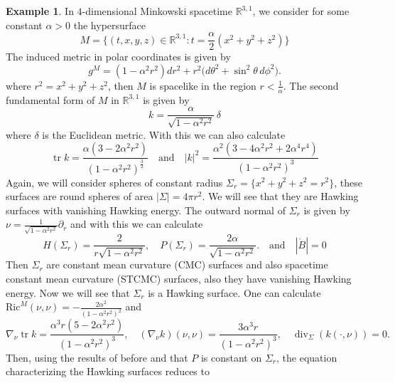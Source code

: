\documentclass[12pt,a4paper]{amsart}
\theoremstyle{plain}
\theoremstyle{definition}
\newtheorem{example}[theorem]{Example}
\newcommand{\diver}{\operatorname{div}}
\newcommand{\tr}{\operatorname{tr}}
\begin{document}
\begin{example}\label{example2}
      In $4$-dimensional Minkowski spacetime  \( \mathbb{R}^{3,1} \), we consider for some constant $\alpha>0$ the hypersurface
$$M=\{(t,x,y,z) \in \mathbb{R}^{3,1} : t=\frac{\alpha}{2} (x^2+y^2+z^2)\} $$
The induced metric in polar coordinates is given by 
\begin{equation}
    g^M = (1-\alpha^2r^2)dr^2
+
r^2 \bigl(d\theta^2 + \sin^2\!\theta\,d\phi^2\bigr).
\end{equation}
where $r^2=x^2+y^2+z^2$, then $M$ is spacelike in the region $r<\frac{1}{\alpha}$.  The second fundamental form of $M$ in $\mathbb{R}^{3,1} $ is given by 
\begin{equation}
    k=\frac{\alpha}{\sqrt{1-\alpha^2r^2 }} \,\delta  
\end{equation}
where $\delta$ is the Euclidean metric. With this we can also calculate
\begin{equation}
    \tr k= \frac{\alpha (3-2\alpha^2r^2)}{(1-\alpha^2 r^2 )^\frac{3}{2}}\quad \text{and} \quad |k|^2= \frac{\alpha^2 (3-4\alpha^2 r^2 +2\alpha^4 r^4)}{(1-\alpha^2 r^2)^3}
\end{equation}
     Again, we will consider spheres of constant radius $\Sigma_r= \{x^2+y^2+z^2=r^2 \}$, these surfaces are round spheres of area $|\Sigma|=4\pi r^2$. We will see that they are Hawking surfaces with vanishing Hawking energy. The outward normal of $\Sigma_r$ is given by $\nu = \frac{1}{\sqrt{1-\alpha^2r^2 }} \partial_r$ and with this we can calculate 
\begin{equation}
    H(\Sigma_r)= \frac{2}{r\sqrt{1-\alpha^2r^2 }},  \quad P(\Sigma_r)= \frac{2\alpha }{\sqrt{1-\alpha^2r^2 }}. \quad \text{and} \quad  |\mathring{B}|=0
\end{equation}
Then $\Sigma_r$ are constant mean curvature (CMC) surfaces and also spacetime constant mean curvature (STCMC) surfaces, also they have vanishing Hawking energy.  Now we will see that $\Sigma_r$ is a Hawking surface. One can calculate $\mathrm{Ric}^M(\nu, \nu)=-\frac{2\alpha^2 }{(1-\alpha^2 r^2 )^2} $ and 
\begin{equation}
    \nabla_\nu \tr k = \frac{\alpha^3r(5-2\alpha^2 r^2)}{(1-\alpha^2r^2)^3}, \quad (\nabla_\nu k)(\nu,\nu)= \frac{3\alpha^3r}{(1-\alpha^2r^2)^3}, \quad \diver_\Sigma (k(\cdot, \nu))=0 .
\end{equation}
Then, using the results of before and that $P$ is constant on $\Sigma_r$, the  equation characterizing the Hawking surfaces reduces to
\begin{equation}

\end{equation}
\end{example}
\end{document}
